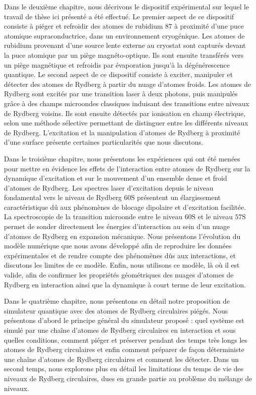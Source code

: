 Dans le deuxième chapitre, nous décrivons le dispositif expérimental sur lequel le travail de thèse ici présenté a été effectué.
Le premier aspect de ce dispositif consiste à piéger et refroidir des atomes de rubidium $87$ à proximité d'une puce atomique supraconductrice, dans un environnement cryogénique.
Les atomes de rubidium provenant d'une source lente externe au cryostat sont capturés devant la puce atomique par un piège magnéto-optique.
Ils sont ensuite transférés vers un piège magnétique et refroidis par évaporation jusqu'à la dégénérescence quantique.
Le second aspect de ce dispositif consiste à exciter, manipuler et détecter des atomes de Rydberg à partir du nuage d'atomes froids.
Les atomes de Rydberg sont excités par une transition laser à deux photons, puis manipulés grâce à des champs microondes classiques induisant des transitions entre niveaux de Rydberg voisins.
Ils sont ensuite détectés par ionisation en champ électrique, selon une méthode sélective permettant de distinguer entre les différents niveaux de Rydberg.
L'excitation et la manipulation d'atomes de Rydberg à proximité d'une surface présente certaines particularités que nous discutons.

Dans le troisième chapitre, nous présentons les expériences qui ont été menées pour mettre en évidence les effets de l'interaction entre atomes de Rydberg sur la dynamique d'excitation et sur le mouvement d'un ensemble dense et froid d'atomes de Rydberg.
Les spectres laser d'excitation depuis le niveau fondamental vers le niveau de Rydberg $\mathrm{60S}$ présentent un élargissement caractéristique dû aux phénomènes de blocage dipolaire et d'excitation facilitée.
La spectroscopie de la transition microonde entre le niveau $\mathrm{60S}$ et le niveau $\mathrm{57S}$ permet de sonder directement les énergies d'interaction au sein d'un nuage d'atomes de Rydberg en expansion mécanique.
Nous présentons l'évolution du modèle numérique que nous avons développé afin de reproduire les données expérimentales et de rendre compte des phénomènes dûs aux interactions, et discutons les limites de ce modèle.
Enfin, nous utilisons ce modèle, là où il est valide, afin de confirmer les propriétés géométriques des nuages d'atomes de Rydberg en interaction ainsi que la dynamique à court terme de leur excitation.

Dans le quatrième chapitre, nous présentons en détail notre proposition de simulateur quantique avec des atomes de Rydberg circulaires piégés.
Nous présentons d'abord le principe général du simulateur proposé : quel système est simulé par une chaîne d'atomes de Rydberg circulaires en interaction et sous quelles conditions, comment piéger et préserver pendant des temps très longs les atomes de Rydberg circulaires et enfin  comment préparer de façon déterministe une chaîne d'atomes de Rydberg circulaires et comment les détecter.
Dans un second temps, nous explorons plus en détail les limitations du temps de vie des niveaux de Rydberg circulaires, dues en grande partie au problème du mélange de niveaux.

